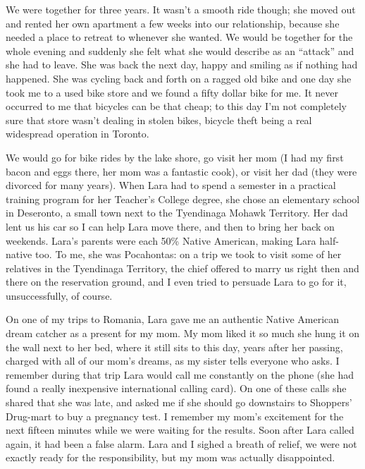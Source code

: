 \documentclass[12pt]{book}
\begin{document}
We were together for three years. It wasn't a smooth ride though; she
moved out and rented her own apartment a few weeks into our
relationship, because she needed a place to retreat to whenever she
wanted. We would be together for the whole evening and suddenly she felt
what she would describe as an ``attack'' and she had to leave. She was
back the next day, happy and smiling as if nothing had happened. She was
cycling back and forth on a ragged old bike and one day she took me to a
used bike store and we found a fifty dollar bike for me. It never
occurred to me that bicycles can be that cheap; to this day I'm not
completely sure that store wasn't dealing in stolen bikes, bicycle theft
being a real widespread operation in Toronto.

We would go for bike rides by the lake shore, go visit her mom (I had my
first bacon and eggs there, her mom was a fantastic cook), or visit her
dad (they were divorced for many years). When Lara had to spend a
semester in a practical training program for her Teacher's College
degree, she chose an elementary school in Deseronto, a small town next
to the Tyendinaga Mohawk Territory. Her dad lent us his car so I can
help Lara move there, and then to bring her back on weekends. Lara's
parents were each 50\% Native American, making Lara half-native too. To
me, she was Pocahontas: on a trip we took to visit some of her relatives
in the Tyendinaga Territory, the chief offered to marry us right then
and there on the reservation ground, and I even tried to persuade Lara
to go for it, unsuccessfully, of course.

On one of my trips to Romania, Lara gave me an authentic Native American
dream catcher as a present for my mom. My mom liked it so much she hung
it on the wall next to her bed, where it still sits to this day, years
after her passing, charged with all of our mom's dreams, as my sister
tells everyone who asks. I remember during that trip Lara would call me
constantly on the phone (she had found a really inexpensive
international calling card). On one of these calls she shared that she
was late, and asked me if she should go downstairs to Shoppers'
Drug-mart to buy a pregnancy test. I remember my mom's excitement for
the next fifteen minutes while we were waiting for the results. Soon
after Lara called again, it had been a false alarm. Lara and I sighed a
breath of relief, we were not exactly ready for the responsibility, but
my mom was actually disappointed.
\end{document}
